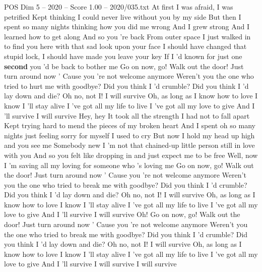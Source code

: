 \begin{textsample}{POS Dim 5 – 2020 – Score 1.00 – 2020/035.txt}  \label{ex:f5_pos_028}
At first I was afraid, I was petrified Kept thinking I could never live without you by my side But then I spent so many nights thinking how you did me wrong And I grew strong And I learned how to get along And so you 're back From outer space I just walked in to find you here with that sad look upon your face I should have changed that stupid lock, I should have made you leave your key If I 'd known for just one \textbf{second} you 'd be back to bother me Go on now, go!
Walk out the door!
Just turn around now ' Cause you 're not welcome anymore Weren't you the one who tried to hurt me with goodbye?
Did you think I 'd crumble?
Did you think I 'd lay down and die?
Oh no, not I!
I will survive Oh, as long as I know how to love I know I 'll stay alive I 've got all my life to live I 've got all my love to give And I 'll survive I will survive Hey, hey It took all the strength I had not to fall apart Kept trying hard to mend the pieces of my broken heart And I spent oh so many nights just feeling sorry for myself I used to cry But now I hold my head up high and you see me Somebody new I 'm not that chained-up little person still in love with you And so you felt like dropping in and just expect me to be free Well, now I 'm saving all my loving for someone who 's loving me Go on now, go!
Walk out the door!
Just turn around now ' Cause you 're not welcome anymore Weren't you the one who tried to break me with goodbye?
Did you think I 'd crumble?
Did you think I 'd lay down and die?
Oh no, not I!
I will survive Oh, as long as I know how to love I know I 'll stay alive I 've got all my life to live I 've got all my love to give And I 'll survive I will survive Oh!
Go on now, go!
Walk out the door!
Just turn around now ' Cause you 're not welcome anymore Weren't you the one who tried to break me with goodbye?
Did you think I 'd crumble?
Did you think I 'd lay down and die?
Oh no, not I!
I will survive Oh, as long as I know how to love I know I 'll stay alive I 've got all my life to live I 've got all my love to give And I 'll survive I will survive I will survive

\end{textsample}
